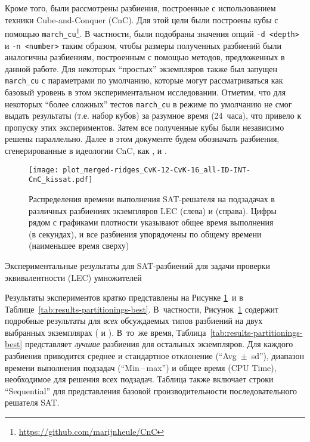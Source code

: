Кроме того, были рассмотрены разбиения, построенные с использованием техники Cube-and-Conquer (CnC).
Для этой цели были построены кубы с помощью \texttt{march\_cu}\footnote{\url{https://github.com/marijnheule/CnC}}.
В частности, были подобраны значения опций \texttt{-d <depth>} и \texttt{-n <number>} таким образом, чтобы размеры полученных разбиений были аналогичны разбиениям, построенным с помощью методов, предложенных в данной работе.
Для некоторых \enquote{простых} экземпляров также был запущен \texttt{march\_cu} с параметрами по умолчанию, которые могут рассматриваться как базовый уровень в этом экспериментальном исследовании.
Отметим, что для некоторых \enquote{более сложных} тестов \texttt{march\_cu} в режиме по умолчанию не смог выдать результаты (т.е. набор кубов) за разумное время (24~часа), что привело к пропуску этих экспериментов.
Затем все полученные кубы были независимо решены параллельно.
Далее в этом документе будем обозначать разбиения, сгенерированные в идеологии CnC, как ,  и .

\begin{figure}[!htb]
    \centering
    \texttt{[image: plot\_merged-ridges\_CvK-12-CvK-16\_all-ID-INT-CnC\_kissat.pdf]}
    \caption{Распределения времени выполнения SAT-решателя на подзадачах в различных разбиениях экземпляров LEC  (слева) и  (справа). Цифры рядом с графиками плотности указывают общее время выполнения (в секундах), и все разбиения упорядочены по общему времени (наименьшее время сверху)}
    \label{fig:ridges}
\end{figure}

\begin{table}[p]
    \centering
    \caption{Экспериментальные результаты для SAT-разбиений для задачи проверки эквивалентности (LEC) умножителей}
    \label{tab:results-partitionings-best}
    
\end{table}

Результаты экспериментов кратко представлены на Рисунке \ref{fig:ridges}~и в Таблице~\ref{tab:results-partitionings-best}.
В~частности, Рисунок~\ref{fig:ridges} содержит
подробные результаты для \textit{всех} обсуждаемых типов разбиений на двух выбранных экземплярах ( и ).
В~то~же время, Таблица~\ref{tab:results-partitionings-best} представляет \emph{лучшие} разбиения для остальных экземпляров.
Для каждого разбиения приводится среднее и стандартное отклонение (\enquote{Avg~$\pm$~sd}), диапазон времени выполнения подзадач (\enquote{Min\,--\,max}) и общее  время (CPU Time), необходимое для решения всех подзадач.
Таблица также включает строки \enquote{Sequential} для представления базовой производительности последовательного решателя SAT.

